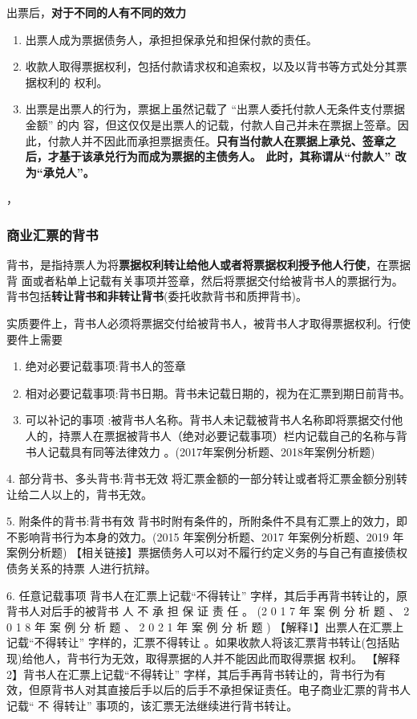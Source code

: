 \documentclass[UTF8,12pt]{ctexart}
\numberwithin{equation}{section} %
\numberwithin{figure}{section}
\numberwithin{table}{section}
\begin{document}
	出票后，\textbf{对于不同的人有不同的效力}
	\begin{enumerate}
		\item 出票人成为票据债务人，承担担保承兑和担保付款的责任。
		
		\item 收款人取得票据权利，包括付款请求权和追索权，以及以背书等方式处分其票据权利的 权利。
		
		\item 出票是出票人的行为，票据上虽然记载了 “出票人委托付款人无条件支付票据金额” 的内 容，但这仅仅是出票人的记载，付款人自己并未在票据上签章。因此，付款人并不因此而承担票据责任。\textbf{只有当付款人在票据上承兑、签章之后，才基于该承兑行为而成为票据的主债务人。 此时，其称谓从“付款人” 改为“承兑人”。}
	\end{enumerate}，

	
	
	
	\subsubsection{商业汇票的背书} 
	背书，是指持票人为将\textbf{票据权利转让给他人或者将票据权利授予他人行使}，在票据背 面或者粘单上记载有关事项并签章，然后将票据交付给被背书人的票据行为。背书包括\textbf{转让背书和非转让背书}(委托收款背书和质押背书)。
	
	实质要件上，背书人必须将票据交付给被背书人，被背书人才取得票据权利。行使要件上需要
	\begin{enumerate}
		\item 绝对必要记载事项:背书人的签章
		
		\item 相对必要记载事项:背书日期。背书未记载日期的，视为在汇票到期日前背书。
		
		\item 可以补记的事项 :被背书人名称。背书人未记载被背书人名称即将票据交付他人的，持票人在票据被背书人（绝对必要记载事项）栏内记载自己的名称与背书人记载具有同等法律效力 。(2017年案例分析题、2018年案例分析题)
	\end{enumerate}

	
	4. 部分背书、多头背书:背书无效 将汇票金额的一部分转让或者将汇票金额分别转让给二人以上的，背书无效。
	
	5. 附条件的背书:背书有效 背书时附有条件的，所附条件不具有汇票上的效力，即不影响背书行为本身的效力。(2015 年案例分析题、2017 年案例分析题、2019 年案例分析题)
	【相关链接】票据债务人可以对不履行约定义务的与自己有直接债权债务关系的持票 人进行抗辩。
	
	6. 任意记载事项
	背书人在汇票上记载“不得转让” 字样，其后手再背书转让的，原背书人对后手的被背书 人 不 承 担 保 证 责 任 。 (2 0 1 7 年 案 例 分 析 题 、 2 0 1 8 年 案 例 分 析 题 、 2 0 2 1 年 案 例 分 析 题 )
	【解释1】出票人在汇票上记载“不得转让” 字样的，汇票不得转让 。如果收款人将该汇票背书转让(包括贴现)给他人，背书行为无效，取得票据的人并不能因此而取得票据 权利。
	【解释2】背书人在汇票上记载“不得转让” 字样，其后手再背书转让的，背书行为有 效，但原背书人对其直接后手以后的后手不承担保证责任。电子商业汇票的背书人记载“ 不 得转让” 事项的，该汇票无法继续进行背书转让。
	
\end{document}
